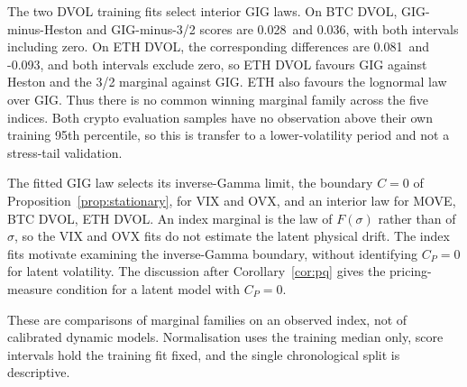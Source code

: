 \documentclass[11pt,a4paper]{article}
\theoremstyle{definition}
\theoremstyle{remark}
\newcommand{\scoreBTCDVOLHeston}{0.028}
\newcommand{\scoreBTCDVOLThreeHalf}{0.036}
\newcommand{\scoreETHDVOLHeston}{0.081}
\newcommand{\scoreETHDVOLThreeHalf}{-0.093}
\begin{document}
The two DVOL training fits select interior GIG laws. On BTC DVOL, GIG-minus-Heston
and GIG-minus-3/2 scores are \scoreBTCDVOLHeston\ and \scoreBTCDVOLThreeHalf,
with both intervals including zero. On ETH DVOL, the corresponding differences are
\scoreETHDVOLHeston\ and \scoreETHDVOLThreeHalf, and both intervals exclude zero, so
ETH DVOL favours GIG against Heston and the 3/2 marginal against GIG. ETH also favours the
lognormal law over GIG. Thus there is no common winning marginal family across
the five indices. Both crypto evaluation samples have no observation above their
own training 95th percentile, so this is transfer to a lower-volatility period
and not a stress-tail validation.

The fitted GIG law selects its inverse-Gamma limit, the boundary $C=0$ of
Proposition~\ref{prop:stationary}, for VIX and OVX, and an
interior law for MOVE, BTC DVOL, ETH DVOL. An index marginal is the law of
$F(\sigma)$ rather than of $\sigma$, so the VIX and OVX fits do not estimate the latent
physical drift. The index fits motivate examining the inverse-Gamma boundary,
without identifying $C_P=0$ for latent volatility. The discussion after
Corollary~\ref{cor:pq} gives the pricing-measure condition for a latent model with $C_P=0$.

These are comparisons of marginal families on an observed index, not of calibrated
dynamic models. Normalisation uses the training median only, score intervals hold
the training fit fixed, and the single chronological split is descriptive.
\end{document}

